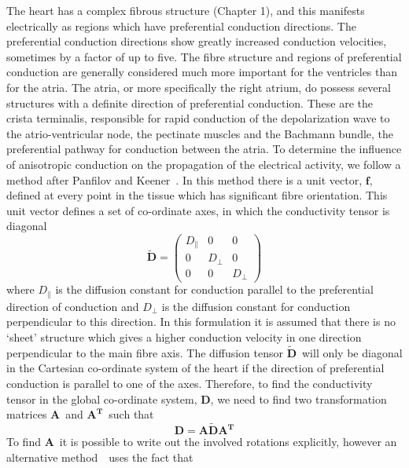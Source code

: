 The heart has a complex fibrous structure (Chapter 1), and this manifests
electrically as regions which have preferential conduction directions.
The preferential conduction directions show greatly increased conduction
velocities, sometimes by a factor of up to five.
The fibre structure and regions of preferential conduction are generally
considered much more important for the ventricles than for the atria.
The atria, or more specifically the right atrium, do possess several structures
with a definite direction of preferential conduction.
These are the crista terminalis, responsible for rapid conduction of the
depolarization wave to the atrio-ventricular node, the pectinate muscles and the
Bachmann bundle, the preferential pathway for conduction between the atria.
To determine the influence of anisotropic conduction on the propagation of the
electrical activity, we follow a method after Panfilov and
Keener~\cite{Panfilov1995}.
In this method there is a unit vector, $\mathbf{f}$, defined at every point in
the tissue which has significant fibre orientation.
This unit vector defines a set of co-ordinate axes, in which the conductivity
tensor is diagonal
\begin{equation}
\label{atrium:dtilde}
\mathbf{\tilde{D}} =
\begin{pmatrix}
D_{\parallel} & 0 & 0\\
0 & D_{\perp} & 0\\
0 & 0 & D_{\perp}
\end{pmatrix}
\end{equation}
where $D_{\parallel}$ is the diffusion constant for conduction parallel to the
preferential direction of conduction and $D_{\perp}$ is the diffusion constant
for conduction perpendicular to this direction.
In this formulation it is assumed that there is no `sheet' structure which gives
a higher conduction velocity in one direction perpendicular to the main fibre
axis.
The diffusion tensor $\mathbf{\tilde{D}}$\ will only be diagonal in the
Cartesian co-ordinate system of the heart if the direction of preferential
conduction is parallel to one of the axes.
Therefore, to find the conductivity tensor in the global co-ordinate system,
$\mathbf{D}$, we need to find two transformation matrices $\mathbf{A}$\ and
$\mathbf{A^{T}}$\ such that
\begin{equation}
\label{atrium:d}
\mathbf{D} = \mathbf{A} \mathbf{\tilde{D}} \mathbf{A^{T}}
\end{equation}
To find $\mathbf{A}$\ it is possible to write out the involved rotations
explicitly, however an alternative method~\cite{Fenton2005}\ uses the fact that
